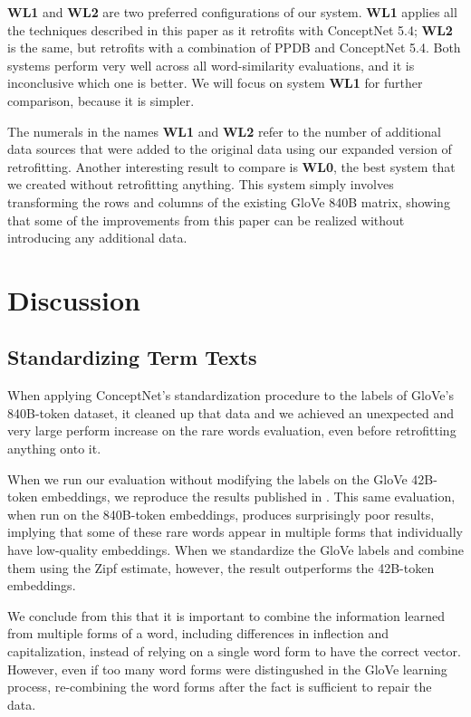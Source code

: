 \documentclass[letterpaper]{article}
\begin{document}
{\bf WL1} and {\bf WL2} are two preferred configurations of our system. {\bf WL1}
applies all the techniques described in this paper as it retrofits with
ConceptNet 5.4; {\bf WL2} is the same, but retrofits with a combination of PPDB and
ConceptNet 5.4. Both systems perform very well across all word-similarity
evaluations, and it is inconclusive which one is better. We will focus on
system {\bf WL1} for further comparison, because it is simpler.

The numerals in the names {\bf WL1} and {\bf WL2} refer to the number of
additional data sources that were added to the original data using our expanded
version of retrofitting. Another interesting result to compare is {\bf WL0},
the best system that we created without retrofitting anything. This system
simply involves transforming the rows and columns of the existing GloVe 840B
matrix, showing that some of the improvements from this paper can be realized
without introducing any additional data.

\section{Discussion}

\subsection{Standardizing Term Texts}

When applying ConceptNet's standardization procedure to the labels of GloVe's
840B-token dataset, it cleaned up that data and we achieved an unexpected and
very large perform increase on the rare words evaluation, even before
retrofitting anything onto it.

When we run our evaluation without modifying the labels on the GloVe 42B-token
embeddings, we reproduce the results published in \cite{pennington2014glove}.
This same evaluation, when run on the 840B-token embeddings, produces
surprisingly poor results, implying that some of these rare words appear in
multiple forms that individually have low-quality embeddings. When we
standardize the GloVe labels and combine them using the Zipf estimate, however,
the result outperforms the 42B-token embeddings.

We conclude from this that it is important to combine the information learned
from multiple forms of a word, including differences in inflection and
capitalization, instead of relying on a single word form to have the correct
vector. However, even if too many word forms were distingushed in the GloVe
learning process, re-combining the word forms after the fact is sufficient to
repair the data.
\end{document}
